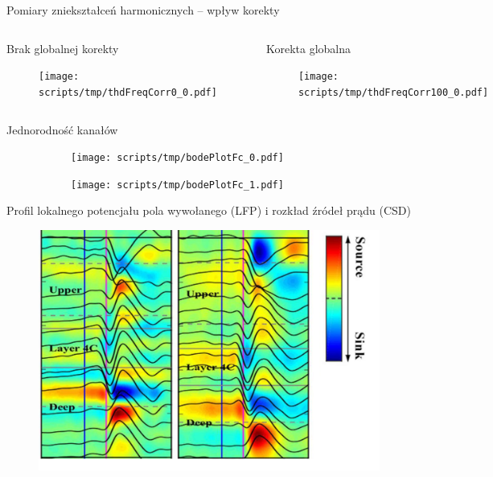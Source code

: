 \begin{frame}{Pomiary zniekształceń harmonicznych -- wpływ korekty}

    \begin{columns}

        \begin{block}{Brak globalnej korekty}
            \begin{figure}[H]
                \centering
                \texttt{[image: scripts/tmp/thdFreqCorr0\_0.pdf]} 
            \end{figure}   
        \end{block}


        \begin{block}{Korekta globalna}
            \begin{figure}[H]
                \centering
                \texttt{[image: scripts/tmp/thdFreqCorr100\_0.pdf]}
            \end{figure}   
        \end{block}
    \end{columns}

\end{frame}

\begin{frame}{Jednorodność kanałów}
    \begin{figure}[H]
        \centering
        \begin{subfigure}[b]{0.485\textwidth}
            \centering
            \texttt{[image: scripts/tmp/bodePlotFc\_0.pdf]}

        \end{subfigure}
        \begin{subfigure}[b]{0.485\textwidth}
            \centering
            \texttt{[image: scripts/tmp/bodePlotFc\_1.pdf]}

        \end{subfigure}     
    \end{figure}
\end{frame}

\begin{frame}{Profil  lokalnego potencjału pola wywołanego (LFP) i rozkład  źródeł prądu (CSD)}
    \begin{figure}[H]


            \centering
            \includegraphics[scale=0.3]{Figures/lfp.png}

    
    \end{figure}
\end{frame}